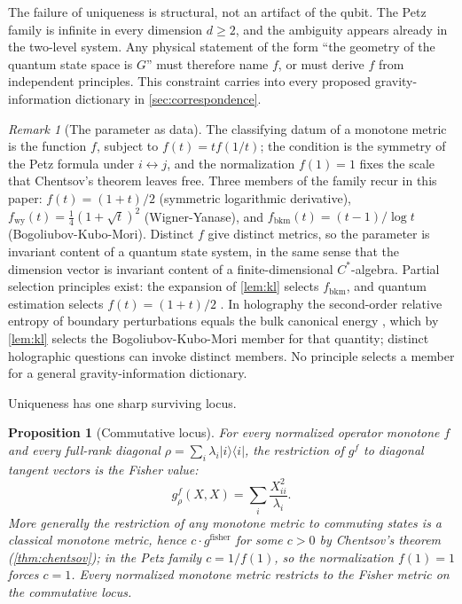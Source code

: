 \documentclass[11pt,letterpaper]{article}
\newtheorem{proposition}[theorem]{Proposition}
\theoremstyle{definition}
\theoremstyle{remark}
\newtheorem{remark}[theorem]{Remark}
\begin{document}
The failure of uniqueness is structural, not an artifact of the qubit. The Petz family is infinite in every dimension $d \geq 2$, and the ambiguity appears already in the two-level system. Any physical statement of the form ``the geometry of the quantum state space is $G$'' must therefore name $f$, or must derive $f$ from independent principles. This constraint carries into every proposed gravity-information dictionary in \cref{sec:correspondence}.

\begin{remark}[The parameter as data]
\label{rem:parameter}
The classifying datum of a monotone metric is the function $f$, subject to $f(t) = t f(1/t)$; the condition is the symmetry of the Petz formula under $i \leftrightarrow j$, and the normalization $f(1) = 1$ fixes the scale that Chentsov's theorem leaves free. Three members of the family recur in this paper: $f(t) = (1+t)/2$ (symmetric logarithmic derivative), $f_{\mathrm{wy}}(t) = \tfrac{1}{4}(1+\sqrt{t})^2$ (Wigner-Yanase), and $f_{\mathrm{bkm}}(t) = (t-1)/\log t$ (Bogoliubov-Kubo-Mori). Distinct $f$ give distinct metrics, so the parameter is invariant content of a quantum state system, in the same sense that the dimension vector is invariant content of a finite-dimensional $C^*$-algebra. Partial selection principles exist: the expansion of \cref{lem:kl} selects $f_{\mathrm{bkm}}$, and quantum estimation selects $f(t) = (1+t)/2$ \cite{braunstein-caves}. In holography the second-order relative entropy of boundary perturbations equals the bulk canonical energy \cite{lashkari-vr}, which by \cref{lem:kl} selects the Bogoliubov-Kubo-Mori member for that quantity; distinct holographic questions can invoke distinct members. No principle selects a member for a general gravity-information dictionary.
\end{remark}

Uniqueness has one sharp surviving locus.

\begin{proposition}[Commutative locus]
\label{prop:commutative}
For every normalized operator monotone $f$ and every full-rank diagonal $\rho = \sum_i \lambda_i |i\rangle\langle i|$, the restriction of $g^{f}$ to diagonal tangent vectors is the Fisher value:
\begin{equation}
g^{f}_{\rho}(X, X) = \sum_i \frac{X_{ii}^2}{\lambda_i}.
\end{equation}
More generally the restriction of any monotone metric to commuting states is a classical monotone metric, hence $c \cdot g^{\mathrm{fisher}}$ for some $c > 0$ by Chentsov's theorem (\cref{thm:chentsov}); in the Petz family $c = 1/f(1)$, so the normalization $f(1) = 1$ forces $c = 1$. Every normalized monotone metric restricts to the Fisher metric on the commutative locus.
\end{proposition}
\end{document}
